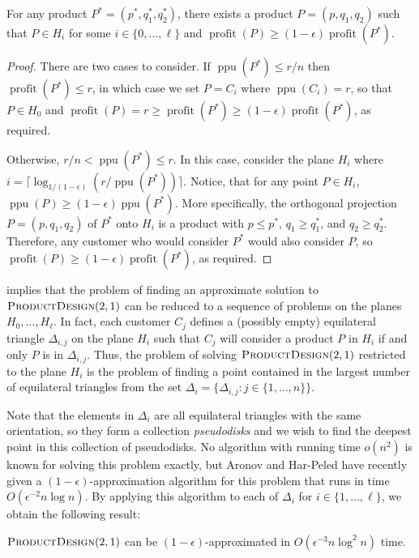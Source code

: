 \documentclass[lotsofwhite]{patmorin}
\newcommand{\ppu}{\operatorname{ppu}}
\newcommand{\val}{\operatorname{profit}}
\newcommand{\eps}{\epsilon}
\begin{document}
\begin{lem}
  For any product $P^*=(p^*,q_1^*,q_2^*)$, there exists a product
  $P=(p,q_1,q_2)$ such that $P\in H_i$ for some $i\in\{0,\ldots,\ell\}$
  and $\val(P) \ge (1-\eps)\val(P^*)$.
\end{lem}

\begin{proof}
  There are two cases to consider.  If $\ppu(P^*) \le r/n$ then $\val(P^*)
  \le r$, in which case we set $P=C_i$ where $\ppu(C_i) = r$, so that
  $P\in H_0$ and $\val(P) = r \ge \val(P^*)\ge (1-\eps)\val(P^*)$,
  as required.

  Otherwise, $r/n < \ppu(P^*) \le r$.  In this case, consider
  the plane $H_i$ where $i = \lceil\log_{1/(1-\eps)}
  (r/\ppu(P^*))\rceil$.  Notice, that for any point $P\in H_i$, $\ppu(P)
  \ge (1-\eps)\ppu(P^*)$.  More specifically, the orthogonal
  projection $P=(p,q_1,q_2)$ of $P^*$ onto $H_i$ is a product with $p\le
  p^*$, $q_1\ge q_1^*$, and $q_2\ge q_2^*$.  Therefore, any customer
  who would consider $P^*$ would also consider $P$, so $\val(P) \ge
  (1-\eps)\val(P^*)$, as required.
\end{proof}

 implies that the problem of finding an
approximate solution to  $\textsc{ProductDesign}(2,1)$ can be reduced
to a sequence of problems on the planes $H_0,\ldots,H_\ell$.  In fact,
each customer $C_j$ defines a (possibly empty) equilateral triangle
$\Delta_{i,j}$ on the plane $H_i$ such that $C_j$ will consider a
product $P$ in $H_i$ if and only $P$ is in $\Delta_{i,j}$.  Thus, the
problem of solving $\textsc{ProductDesign}(2,1)$ restricted to the
plane $H_i$ is the problem of finding a point contained in the largest
number of equilateral triangles from the set $\Delta_i=\{\Delta_{i,j}:
j\in\{1,\ldots,n\}\}$.

Note that the elements in $\Delta_i$ are all equilateral triangles
with the same orientation, so they form a collection
\emph{pseudodisks} and we wish to find the deepest point in this
collection of pseudodisks.  No algorithm with running time $o(n^2)$ is
known for solving this problem exactly, but Aronov and Har-Peled have
recently given a $(1-\eps)$-approximation algorithm for this
problem that runs in time $O(\eps^{-2}n\log n)$.  By applying this
algorithm to each of $\Delta_i$ for $i\in\{1,\ldots,\ell\}$, we obtain
the following result:

\begin{thm}
  $\textsc{ProductDesign}(2,1)$ can be $(1-\eps)$-approximated in
  $O(\eps^{-3}n\log^2 n)$ time.
\end{thm}
\end{document}
